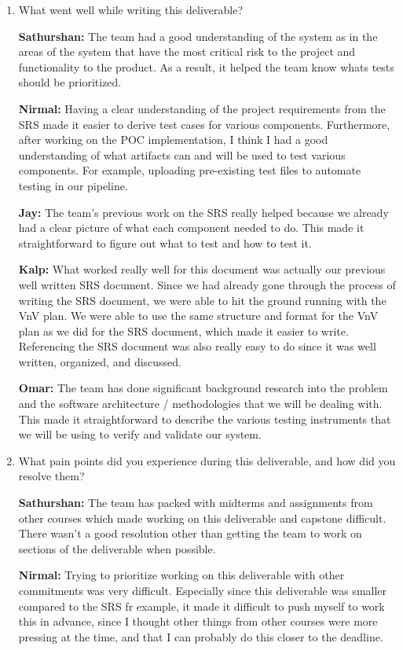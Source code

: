 \documentclass[12pt, titlepage]{article}
\begin{document}
\begin{enumerate}
  \item What went well while writing this deliverable?

  \textbf{Sathurshan:} The team had a good understanding of the system as in
  the areas of the system that have the most critical risk to the project and
  functionality to the product. As a result, it helped the team know whats tests
  should be prioritized.

  \textbf{Nirmal:} Having a clear understanding of the project requirements 
  from the SRS made it easier to derive test cases for various components. 
  Furthermore, after working on the POC implementation, I think I had a good 
  understanding of what artifacts can and will be used to test various 
  components. For example, uploading pre-existing test files to automate 
  testing in our pipeline.

  \textbf{Jay:} The team's previous work on the SRS really helped because we already 
  had a clear picture of what each component needed to do. 
  This made it straightforward to figure out what to test and how to test it.

  \textbf{Kalp:} What worked really well for this document was actually our 
  previous well written SRS document. Since we had already gone through the 
  process of writing the SRS document, we were able to hit the ground running 
  with the VnV plan. We were able to use the same structure and format for the 
  VnV plan as we did for the SRS document, which made it easier to write.
  Referencing the SRS document was also really easy to do since it was well 
  written, organized, and discussed. 

  \textbf{Omar:} The team has done significant background research into the 
  problem and the software architecture / methodologies that we will be dealing 
  with. This made it straightforward to describe the various testing instruments
  that we will be using to verify and validate our system.

  \item What pain points did you experience during this deliverable, and how
    did you resolve them?

  \textbf{Sathurshan:} The team has packed with midterms and assignments from
  other courses which made working on this deliverable and capstone difficult.
  There wasn't a good resolution other than getting the team to work on sections
  of the deliverable when possible.

  \textbf{Nirmal:} Trying to prioritize working on this deliverable with other 
  commitments was very difficult. Especially since this deliverable was smaller 
  compared to the SRS fr example, it made it difficult to push myself to work 
  this in advance, since I thought other things from other courses were more 
  pressing at the time, and that I can probably do this closer to the deadline.


\end{enumerate}
\end{document}

